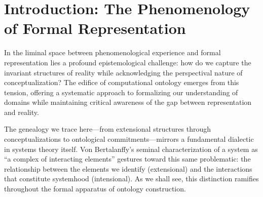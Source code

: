 \section{Introduction: The Phenomenology of Formal Representation}

In the liminal space between phenomenological experience and formal representation lies a profound epistemological challenge: how do we capture the invariant structures of reality while acknowledging the perspectival nature of conceptualization? The edifice of computational ontology emerges from this tension, offering a systematic approach to formalizing our understanding of domains while maintaining critical awareness of the gap between representation and reality.

The genealogy we trace here—from extensional structures through conceptualizations to ontological commitments—mirrors a fundamental dialectic in systems theory itself. Von Bertalanffy's seminal characterization of a system as ``a complex of interacting elements'' \cite{Bertalanffy1968} gestures toward this same problematic: the relationship between the elements we identify (extensional) and the interactions that constitute systemhood (intensional). As we shall see, this distinction ramifies throughout the formal apparatus of ontology construction.